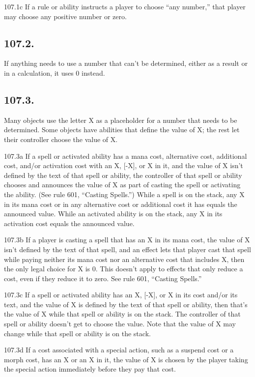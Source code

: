 107.1c If a rule or ability instructs a player to choose “any number,” that player may choose any positive number or zero.

\subsection*{107.2.}
If anything needs to use a number that can’t be determined, either as a result or in a calculation, it uses 0 instead.

\subsection*{107.3.}
Many objects use the letter X as a placeholder for a number that needs to be determined. Some objects have abilities that define the value of X; the rest let their controller choose the value of X.

107.3a If a spell or activated ability has a mana cost, alternative cost, additional cost, and/or activation cost with an {X}, [-X], or X in it, and the value of X isn’t defined by the text of that spell or ability, the controller of that spell or ability chooses and announces the value of X as part of casting the spell or activating the ability. (See rule 601, “Casting Spells.”) While a spell is on the stack, any X in its mana cost or in any alternative cost or additional cost it has equals the announced value. While an activated ability is on the stack, any X in its activation cost equals the announced value.

107.3b If a player is casting a spell that has an {X} in its mana cost, the value of X isn’t defined by the text of that spell, and an effect lets that player cast that spell while paying neither its mana cost nor an alternative cost that includes X, then the only legal choice for X is 0. This doesn’t apply to effects that only reduce a cost, even if they reduce it to zero. See rule 601, “Casting Spells.”

107.3c If a spell or activated ability has an {X}, [-X], or X in its cost and/or its text, and the value of X is defined by the text of that spell or ability, then that’s the value of X while that spell or ability is on the stack. The controller of that spell or ability doesn’t get to choose the value. Note that the value of X may change while that spell or ability is on the stack.

107.3d If a cost associated with a special action, such as a suspend cost or a morph cost, has an {X} or an X in it, the value of X is chosen by the player taking the special action immediately before they pay that cost.

